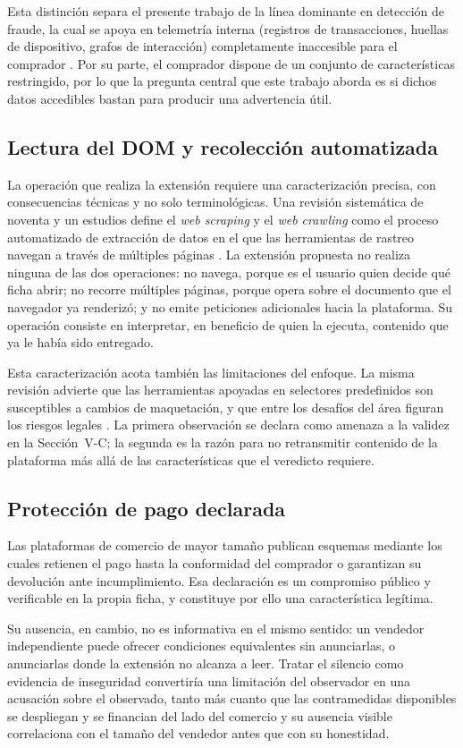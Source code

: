 Esta distinción separa el presente trabajo de la línea dominante en detección de fraude, 
la cual se apoya en telemetría interna (registros de transacciones, huellas de dispositivo, grafos de
interacción) completamente inaccesible para el comprador \cite{ref28}. Por su parte,  el comprador dispone de un
conjunto de características restringido, por lo que la pregunta central que este trabajo aborda es si dichos datos accedibles bastan para 
producir una advertencia útil.

\subsection{Lectura del DOM y recolección automatizada}

La operación que realiza la extensión requiere una caracterización precisa, con consecuencias
técnicas y no solo terminológicas. Una revisión sistemática de noventa y un estudios define el
\textit{web scraping} y el \textit{web crawling} como el proceso automatizado de extracción de
datos en el que las herramientas de rastreo navegan a través de múltiples páginas
\cite{ref24}. La extensión propuesta no realiza ninguna de las dos operaciones: no navega,
porque es el usuario quien decide qué ficha abrir; no recorre múltiples páginas, porque opera
sobre el documento que el navegador ya renderizó; y no emite peticiones adicionales hacia la
plataforma. Su operación consiste en interpretar, en beneficio de quien la ejecuta, contenido
que ya le había sido entregado.

Esta caracterización acota también las limitaciones del enfoque. La misma revisión advierte
que las herramientas apoyadas en selectores predefinidos son susceptibles a cambios de
maquetación, y que entre los desafíos del área figuran los riesgos legales \cite{ref24}. La
primera observación se declara como amenaza a la validez en la Sección~V-C; la segunda es la
razón para no retransmitir contenido de la plataforma más allá de las características que el
veredicto requiere.

\subsection{Protección de pago declarada}

Las plataformas de comercio de mayor tamaño publican esquemas mediante los cuales retienen el
pago hasta la conformidad del comprador o garantizan su devolución ante incumplimiento. Esa
declaración es un compromiso público y verificable en la propia ficha, y constituye por ello
una característica legítima.

Su ausencia, en cambio, no es informativa en el mismo sentido: un vendedor independiente
puede ofrecer condiciones equivalentes sin anunciarlas, o anunciarlas donde la extensión no
alcanza a leer. Tratar el silencio como evidencia de inseguridad convertiría una limitación
del observador en una acusación sobre el observado, tanto más cuanto que las contramedidas
disponibles se despliegan y se financian del lado del comercio \cite{ref30} y su ausencia
visible correlaciona con el tamaño del vendedor antes que con su honestidad.
